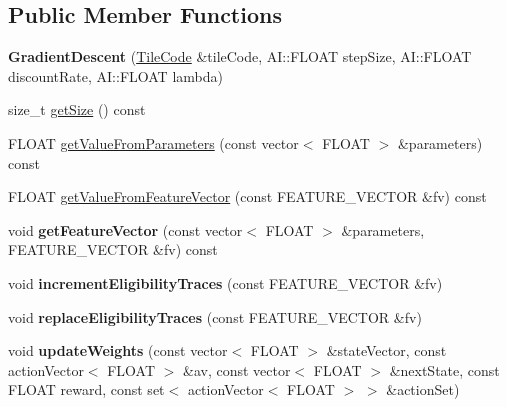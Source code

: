 \subsection*{Public Member Functions}
\begin{DoxyCompactItemize}
\item 
\hypertarget{classAI_1_1Algorithm_1_1GradientDescent_a8432f6a139bfac60422558841e6b79ad}{{\bfseries Gradient\-Descent} (\hyperlink{classAI_1_1Algorithm_1_1TileCode}{Tile\-Code} \&tile\-Code, A\-I\-::\-F\-L\-O\-A\-T step\-Size, A\-I\-::\-F\-L\-O\-A\-T discount\-Rate, A\-I\-::\-F\-L\-O\-A\-T lambda)}\label{classAI_1_1Algorithm_1_1GradientDescent_a8432f6a139bfac60422558841e6b79ad}

\item 
size\-\_\-t \hyperlink{classAI_1_1Algorithm_1_1GradientDescent_a04a6c7f4c2e0046dd70b2cfd98322971}{get\-Size} () const 
\item 
F\-L\-O\-A\-T \hyperlink{classAI_1_1Algorithm_1_1GradientDescent_a8dcc60ebf28babbe120fe7b20334380f}{get\-Value\-From\-Parameters} (const vector$<$ F\-L\-O\-A\-T $>$ \&parameters) const 
\item 
F\-L\-O\-A\-T \hyperlink{classAI_1_1Algorithm_1_1GradientDescent_a19111aa6a83836a2e12e623e4004c4d3}{get\-Value\-From\-Feature\-Vector} (const F\-E\-A\-T\-U\-R\-E\-\_\-\-V\-E\-C\-T\-O\-R \&fv) const 
\item 
\hypertarget{classAI_1_1Algorithm_1_1GradientDescent_a6a625b771afbda36509c2b38843825bf}{void {\bfseries get\-Feature\-Vector} (const vector$<$ F\-L\-O\-A\-T $>$ \&parameters, F\-E\-A\-T\-U\-R\-E\-\_\-\-V\-E\-C\-T\-O\-R \&fv) const }\label{classAI_1_1Algorithm_1_1GradientDescent_a6a625b771afbda36509c2b38843825bf}

\item 
\hypertarget{classAI_1_1Algorithm_1_1GradientDescent_a68b6d1772a25ce2d6d98cfd3ab697b02}{void {\bfseries increment\-Eligibility\-Traces} (const F\-E\-A\-T\-U\-R\-E\-\_\-\-V\-E\-C\-T\-O\-R \&fv)}\label{classAI_1_1Algorithm_1_1GradientDescent_a68b6d1772a25ce2d6d98cfd3ab697b02}

\item 
\hypertarget{classAI_1_1Algorithm_1_1GradientDescent_ae0038bf21f9576cfa0d24a942f0a6c5a}{void {\bfseries replace\-Eligibility\-Traces} (const F\-E\-A\-T\-U\-R\-E\-\_\-\-V\-E\-C\-T\-O\-R \&fv)}\label{classAI_1_1Algorithm_1_1GradientDescent_ae0038bf21f9576cfa0d24a942f0a6c5a}

\item 
\hypertarget{classAI_1_1Algorithm_1_1GradientDescent_a80faa3771790c726f20f2edff4ad8ff5}{void {\bfseries update\-Weights} (const vector$<$ F\-L\-O\-A\-T $>$ \&state\-Vector, const action\-Vector$<$ F\-L\-O\-A\-T $>$ \&av, const vector$<$ F\-L\-O\-A\-T $>$ \&next\-State, const F\-L\-O\-A\-T reward, const set$<$ action\-Vector$<$ F\-L\-O\-A\-T $>$ $>$ \&action\-Set)}\label{classAI_1_1Algorithm_1_1GradientDescent_a80faa3771790c726f20f2edff4ad8ff5}


\end{DoxyCompactItemize}

